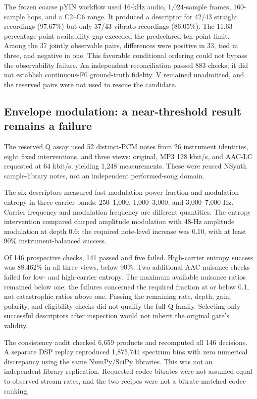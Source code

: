 The frozen coarse pYIN workflow used 16-kHz audio, 1,024-sample frames,
160-sample hops, and a C2--C6 range. It produced a descriptor for 42/43 straight
recordings (97.67\%) but only 37/43 vibrato recordings (86.05\%). The 11.63
percentage-point availability gap exceeded the predeclared ten-point limit.
Among the 37 jointly observable pairs, differences were positive in 33, tied
in three, and negative in one. This favorable conditional ordering could not
bypass the observability failure. An independent reconciliation passed 883
checks; it did not establish continuous-F0 ground-truth fidelity. V remained
unadmitted, and the reserved pairs were not used to rescue the candidate.

\subsection{Envelope modulation: a near-threshold result remains a failure}

The reserved Q assay used 52 distinct-PCM notes from 26 instrument identities,
eight fixed interventions, and three views: original, MP3 128 kbit/s, and
AAC-LC requested at 64 kbit/s, yielding 1,248 measurements. These were reused
NSynth sample-library notes, not an independent performed-song domain.

The six descriptors measured fast modulation-power fraction and modulation
entropy in three carrier bands: 250--1,000, 1,000--3,000, and 3,000--7,000 Hz.
Carrier frequency and modulation frequency are different quantities. The
entropy intervention compared chirped amplitude modulation with 48-Hz
amplitude modulation at depth 0.6; the required note-level increase was 0.10,
with at least 90\% instrument-balanced success.

Of 146 prospective checks, 141 passed and five failed. High-carrier entropy
success was 88.462\% in all three views, below 90\%. Two additional AAC
nuisance checks failed for low- and high-carrier entropy. The maximum available
nuisance ratios remained below one; the failures concerned the required
fraction at or below 0.1, not catastrophic ratios above one. Passing the
remaining rate, depth, gain, polarity, and eligibility checks did not qualify
the full Q family. Selecting only successful descriptors after inspection
would not inherit the original gate's validity.

The consistency audit checked 6,659 products and recomputed all 146 decisions.
A separate DSP replay reproduced 1,875,744 spectrum bins with zero numerical
discrepancy using the same NumPy/SciPy libraries. This was not an
independent-library replication. Requested codec bitrates were not assumed
equal to observed stream rates, and the two recipes were not a bitrate-matched
codec ranking.

